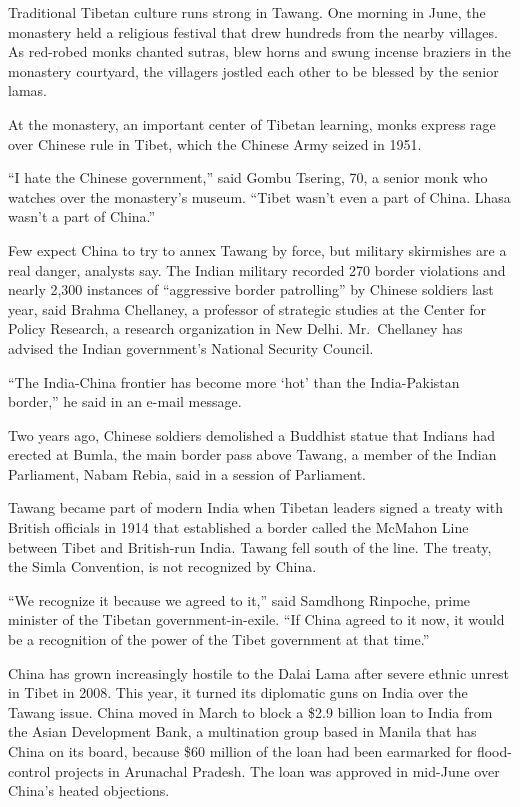 ﻿\documentclass[12pt]{article}
\begin{document}
Traditional Tibetan culture runs strong in Tawang. One morning in June, the monastery held a
religious festival that drew hundreds from the nearby villages. As red-robed monks chanted sutras,
blew horns and swung incense braziers in the monastery courtyard, the villagers jostled each other
to be blessed by the senior lamas.

At the monastery, an important center of Tibetan learning, monks express rage over Chinese rule in
Tibet, which the Chinese Army seized in 1951.

``I hate the Chinese government,'' said Gombu Tsering, 70, a senior monk who watches over the
monastery's museum. ``Tibet wasn't even a part of China. Lhasa wasn't a part of China.''

Few expect China to try to annex Tawang by force, but military skirmishes are a real danger,
analysts say. The Indian military recorded 270 border violations and nearly 2,300 instances of
``aggressive border patrolling'' by Chinese soldiers last year, said Brahma Chellaney, a professor
of strategic studies at the Center for Policy Research, a research organization in New Delhi.
Mr.~Chellaney has advised the Indian government's National Security Council.

``The India-China frontier has become more `hot' than the India-Pakistan border,'' he said in an
e-mail message.

Two years ago, Chinese soldiers demolished a Buddhist statue that Indians had erected at Bumla, the
main border pass above Tawang, a member of the Indian Parliament, Nabam Rebia, said in a session of
Parliament.

Tawang became part of modern India when Tibetan leaders signed a treaty with British officials in
1914 that established a border called the McMahon Line between Tibet and British-run India. Tawang
fell south of the line. The treaty, the Simla Convention, is not recognized by China.

``We recognize it because we agreed to it,'' said Samdhong Rinpoche, prime minister of the Tibetan
government-in-exile. ``If China agreed to it now, it would be a recognition of the power of the
Tibet government at that time.''

China has grown increasingly hostile to the Dalai Lama after severe ethnic unrest in Tibet in 2008.
This year, it turned its diplomatic guns on India over the Tawang issue. China moved in March to
block a \$2.9 billion loan to India from the Asian Development Bank, a multination group based in
Manila that has China on its board, because \$60 million of the loan had been earmarked for
flood-control projects in Arunachal Pradesh. The loan was approved in mid-June over China's heated
objections.
\end{document}
